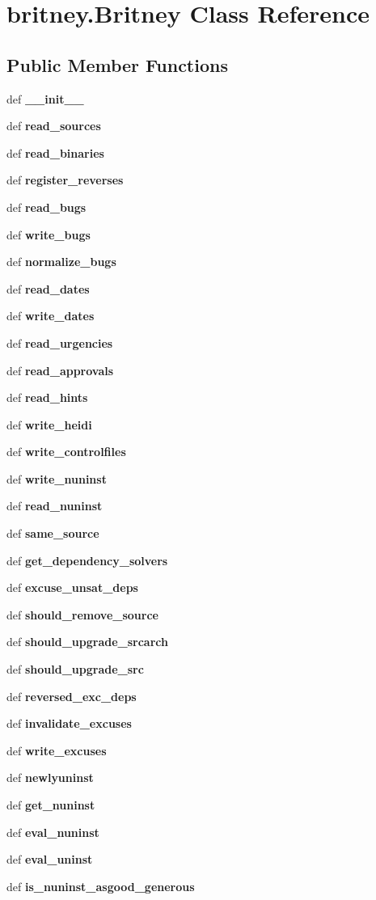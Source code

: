 \section{britney.Britney Class Reference}
\label{classbritney_1_1Britney}
\subsection*{Public Member Functions}
\begin{CompactItemize}
\item 
def \bf{\_\-\_\-init\_\-\_\-}
\item 
def \bf{read\_\-sources}
\item 
def \bf{read\_\-binaries}
\item 
def \bf{register\_\-reverses}
\item 
def \bf{read\_\-bugs}
\item 
def \bf{write\_\-bugs}
\item 
def \bf{normalize\_\-bugs}
\item 
def \bf{read\_\-dates}
\item 
def \bf{write\_\-dates}
\item 
def \bf{read\_\-urgencies}
\item 
def \bf{read\_\-approvals}
\item 
def \bf{read\_\-hints}
\item 
def \bf{write\_\-heidi}
\item 
def \bf{write\_\-controlfiles}
\item 
def \bf{write\_\-nuninst}
\item 
def \bf{read\_\-nuninst}
\item 
def \bf{same\_\-source}
\item 
def \bf{get\_\-dependency\_\-solvers}
\item 
def \bf{excuse\_\-unsat\_\-deps}
\item 
def \bf{should\_\-remove\_\-source}
\item 
def \bf{should\_\-upgrade\_\-srcarch}
\item 
def \bf{should\_\-upgrade\_\-src}
\item 
def \bf{reversed\_\-exc\_\-deps}
\item 
def \bf{invalidate\_\-excuses}
\item 
def \bf{write\_\-excuses}
\item 
def \bf{newlyuninst}
\item 
def \bf{get\_\-nuninst}
\item 
def \bf{eval\_\-nuninst}
\item 
def \bf{eval\_\-uninst}
\item 
def \bf{is\_\-nuninst\_\-asgood\_\-generous}\label{classbritney_1_1Britney_2f7401c8e41b8095bd99bd656bb41546}


\end{CompactItemize}
